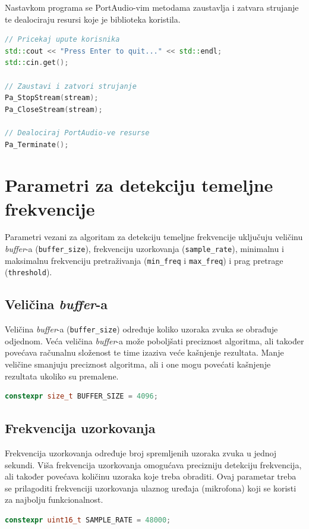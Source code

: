 \documentclass[times, utf8, diplomski, numeric]{fer}
\begin{document}
Nastavkom programa se PortAudio-vim metodama zaustavlja i zatvara strujanje te dealociraju resursi koje je biblioteka koristila.

\begin{lstlisting}[language=C++, frame=single]
// Pricekaj upute korisnika
std::cout << "Press Enter to quit..." << std::endl;
std::cin.get();
	
// Zaustavi i zatvori strujanje
Pa_StopStream(stream);
Pa_CloseStream(stream);
	
// Dealociraj PortAudio-ve resurse
Pa_Terminate();
\end{lstlisting}

\section{Parametri za detekciju temeljne frekvencije}
%
Parametri vezani za algoritam za detekciju temeljne frekvencije uključuju veličinu \textit{buffer}-a (\verb*|buffer_size|), frekvenciju uzorkovanja (\verb*|sample_rate|), minimalnu i maksimalnu frekvenciju pretraživanja (\verb*|min_freq| i \verb*|max_freq|) i prag pretrage (\verb*|threshold|).

\subsection{Veličina \textit{buffer}-a}
%
Veličina \textit{buffer}-a (\verb*|buffer_size|) određuje koliko uzoraka zvuka se obrađuje odjednom. Veća veličina \textit{buffer}-a može poboljšati preciznost algoritma, ali također povećava računalnu složenost te time izaziva veće kašnjenje rezultata. Manje veličine smanjuju preciznost algoritma, ali i one mogu povećati kašnjenje rezultata ukoliko su premalene.
\begin{lstlisting}[language=C++, frame=single]
constexpr size_t BUFFER_SIZE = 4096;
\end{lstlisting}

\subsection{Frekvencija uzorkovanja}
%
Frekvencija uzorkovanja određuje broj spremljenih uzoraka zvuka u jednoj sekundi. Viša frekvencija uzorkovanja omogućava precizniju detekciju frekvencija, ali također povećava količinu uzoraka koje treba obraditi. Ovaj parametar treba se prilagoditi frekvenciji uzorkovanja ulaznog uređaja (mikrofona) koji se koristi za najbolju funkcionalnost.
\begin{lstlisting}[language=C++, frame=single]
constexpr uint16_t SAMPLE_RATE = 48000;
\end{lstlisting}
\end{document}
